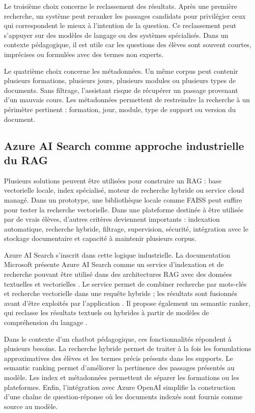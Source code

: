 Le troisième choix concerne le reclassement des résultats. Après une première recherche,
un système peut reranker les passages candidats pour privilégier ceux qui correspondent
le mieux à l'intention de la question. Ce reclassement peut s'appuyer sur des modèles de
langage ou des systèmes spécialisés. Dans un contexte pédagogique, il est utile car les
questions des élèves sont souvent courtes, imprécises ou formulées avec des termes non
experts.

Le quatrième choix concerne les métadonnées. Un même corpus peut contenir plusieurs
formations, plusieurs jours, plusieurs modules ou plusieurs types de documents. Sans
filtrage, l'assistant risque de récupérer un passage provenant d'un mauvais cours. Les
métadonnées permettent de restreindre la recherche à un périmètre pertinent : formation,
jour, module, type de support ou version du document.

\subsection{Azure AI Search comme approche industrielle du RAG}

Plusieurs solutions peuvent être utilisées pour construire un RAG : base vectorielle locale,
index spécialisé, moteur de recherche hybride ou service cloud managé. Dans un prototype,
une bibliothèque locale comme FAISS peut suffire pour tester la recherche vectorielle.
Dans une plateforme destinée à être utilisée par de vrais élèves, d'autres critères
deviennent importants : indexation automatique, recherche hybride, filtrage, supervision,
sécurité, intégration avec le stockage documentaire et capacité à maintenir plusieurs
corpus.

Azure AI Search s'inscrit dans cette logique industrielle. La documentation Microsoft
présente Azure AI Search comme un service d'indexation et de recherche pouvant être
utilisé dans des architectures RAG avec des données textuelles et vectorielles
\cite{microsoft2026foundryrag}. Le service permet de combiner recherche par mots-clés
et recherche vectorielle dans une requête hybride ; les résultats sont fusionnés avant
d'être exploités par l'application \cite{microsoft2026hybridsearch}. Il propose également
un semantic ranker, qui reclasse les résultats textuels ou hybrides à partir de modèles de
compréhension du langage \cite{microsoft2026semanticranker}.

Dans le contexte d'un chatbot pédagogique, ces fonctionnalités répondent à plusieurs
besoins. La recherche hybride permet de traiter à la fois les formulations approximatives
des élèves et les termes précis présents dans les supports. Le semantic ranking permet
d'améliorer la pertinence des passages présentés au modèle. Les index et métadonnées
permettent de séparer les formations ou les plateformes. Enfin, l'intégration avec Azure
OpenAI simplifie la construction d'une chaîne de question-réponse où les documents
indexés sont fournis comme source au modèle.

